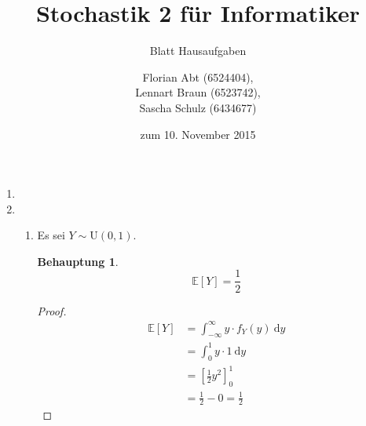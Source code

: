 \documentclass[a4paper]{scrartcl}
\title{Stochastik 2 für Informatiker}
\subtitle{Blatt {\blattnr} Hausaufgaben}
\author{
    Florian Abt (6524404), \\
    Lennart Braun (6523742), \\
    Sascha Schulz (6434677)
}
\date{zum 10. November 2015}
\newtheorem*{behaupt}{Behauptung}
\newcommand{\dif}{\ \mathrm{d}}
\newcommand{\e}{\mathbb{E}}
\def \blattnr {4}
\begin{document}
\maketitle

\begin{enumerate}[label=\bfseries \blattnr.\arabic*]
    \item

    \item
        \begin{enumerate}
            \item
                Es sei $Y \sim \text{U}(0,1)$.
                \begin{behaupt}
                    \begin{equation*}
                        \e[Y] = \frac{1}{2}
                    \end{equation*}
                \end{behaupt}
                \begin{proof}
                    \begin{equation*}
                        \begin{split}
                            \e[Y]
                            &= \int_{-\infty}^\infty y \cdot f_Y(y) \dif y \\
                            &= \int_0^1 y \cdot 1 \dif y \\
                            &= \left[ \frac{1}{2}y^2 \right]_0^1 \\
                            &= \frac{1}{2} - 0 = \frac{1}{2}
                        \end{split}
                    \end{equation*}
                \end{proof}


\end{enumerate}
\end{enumerate}
\end{document}
